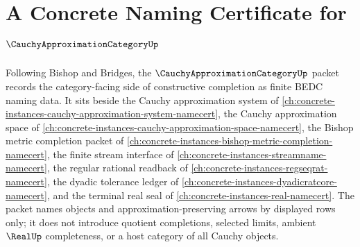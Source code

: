 \chapter{A Concrete Naming Certificate for $\CauchyApproximationCategoryUp$}
\label{ch:concrete-instances-cauchy-approximation-category-namecert}

Following Bishop and Bridges, the $\CauchyApproximationCategoryUp$ packet records the category-facing side of constructive completion as finite BEDC naming data. It sits beside the Cauchy approximation system of \autoref{ch:concrete-instances-cauchy-approximation-system-namecert}, the Cauchy approximation space of \autoref{ch:concrete-instances-cauchy-approximation-space-namecert}, the Bishop metric completion packet of \autoref{ch:concrete-instances-bishop-metric-completion-namecert}, the finite stream interface of \autoref{ch:concrete-instances-streamname-namecert}, the regular rational readback of \autoref{ch:concrete-instances-regseqrat-namecert}, the dyadic tolerance ledger of \autoref{ch:concrete-instances-dyadicratcore-namecert}, and the terminal real seal of \autoref{ch:concrete-instances-real-namecert}. The packet names objects and approximation-preserving arrows by displayed rows only; it does not introduce quotient completions, selected limits, ambient $\RealUp$ completeness, or a host category of all Cauchy objects.

